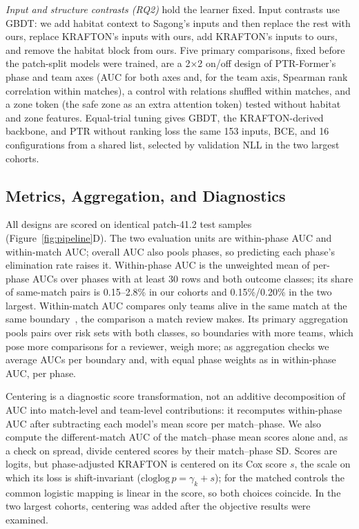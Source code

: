 \documentclass[sigconf,anonymous,nonacm]{acmart}
\begin{document}
\emph{Input and structure contrasts (RQ2)} hold the learner fixed. Input contrasts use GBDT: we add habitat context to Sagong's inputs and then replace the rest with ours, replace KRAFTON's inputs with ours, add KRAFTON's inputs to ours, and remove the habitat block from ours. Five primary comparisons, fixed before the patch-split models were trained, are a 2$\times$2 on/off design of PTR-Former's phase and team axes (AUC for both axes and, for the team axis, Spearman rank correlation within matches), a control with relations shuffled within matches, and a zone token (the safe zone as an extra attention token) tested without habitat and zone features. Equal-trial tuning gives GBDT, the KRAFTON-derived backbone, and PTR without ranking loss the same 153 inputs, BCE, and 16 configurations from a shared list, selected by validation NLL in the two largest cohorts.

\subsection{Metrics, Aggregation, and Diagnostics}
\label{sec:method:units}
All designs are scored on identical patch-41.2 test samples (Figure~\ref{fig:pipeline}D). The two evaluation units are within-phase AUC and within-match AUC; overall AUC also pools phases, so predicting each phase's elimination rate raises it. Within-phase AUC is the unweighted mean of per-phase AUCs over phases with at least 30 rows and both outcome classes; its share of same-match pairs is 0.15--2.8\% in our cohorts and 0.15\%/0.20\% in the two largest. Within-match AUC compares only teams alive in the same match at the same boundary~\cite{HeagertyZheng05,vanKlaveren14}, the comparison a match review makes. Its primary aggregation pools pairs over risk sets with both classes, so boundaries with more teams, which pose more comparisons for a reviewer, weigh more; as aggregation checks we average AUCs per boundary and, with equal phase weights as in within-phase AUC, per phase.

Centering is a diagnostic score transformation, not an additive decomposition of AUC into match-level and team-level contributions: it recomputes within-phase AUC after subtracting each model's mean score per match--phase. We also compute the different-match AUC of the match--phase mean scores alone and, as a check on spread, divide centered scores by their match--phase SD. Scores are logits, but phase-adjusted KRAFTON is centered on its Cox score $s$, the scale on which its loss is shift-invariant ($\mathrm{cloglog}\,p=\gamma_k+s$); for the matched controls the common logistic mapping is linear in the score, so both choices coincide. In the two largest cohorts, centering was added after the objective results were examined.
\end{document}

